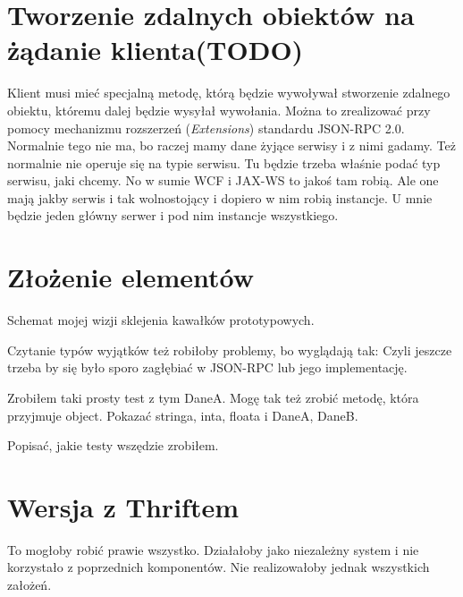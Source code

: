 \section{Tworzenie zdalnych obiektów na żądanie klienta(TODO)}
Klient musi mieć specjalną metodę, którą będzie wywoływał stworzenie zdalnego obiektu, któremu dalej będzie wysyłał wywołania.
Można to zrealizować przy pomocy mechanizmu rozszerzeń (\emph{Extensions}) standardu JSON-RPC 2.0.
Normalnie tego nie ma, bo raczej mamy dane żyjące serwisy i z nimi gadamy. Też normalnie nie operuje się na typie serwisu. Tu będzie trzeba właśnie podać typ serwisu, jaki chcemy. No w sumie WCF i JAX-WS to jakoś tam robią. Ale one mają jakby serwis i tak wolnostojący i dopiero w nim robią instancje. U mnie będzie jeden główny serwer i pod nim instancje wszystkiego.



\section{Złożenie elementów}
Schemat mojej wizji sklejenia kawałków prototypowych.

Czytanie typów wyjątków też robiłoby problemy, bo wyglądają tak:
Czyli jeszcze trzeba by się było sporo zagłębiać w JSON-RPC lub jego implementację.

Zrobiłem taki prosty test z tym DaneA. Mogę tak też zrobić metodę, która przyjmuje object. Pokazać stringa, inta, floata i DaneA, DaneB.

Popisać, jakie testy wszędzie zrobiłem.

\section{Wersja z Thriftem}
To mogłoby robić prawie wszystko. Działałoby jako niezależny system i nie korzystało z poprzednich komponentów. Nie realizowałoby jednak wszystkich założeń.